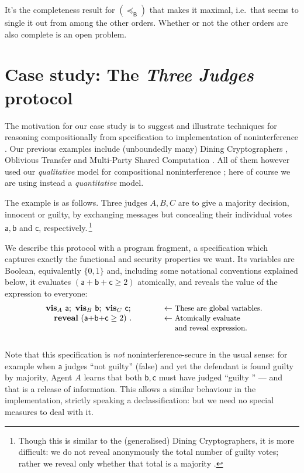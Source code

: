 \documentclass[runningheads]{llncs}
\makeatletter
\newcommand{\Bt}{\mathsf{B}}
\newcommand\Va {\mathsf{a}}
\newcommand\Vb {\mathsf{b}}
\newcommand\Vc {\mathsf{c}}
\newcommand\BRef {\mathrel{\preceq_\Bt}}
\newcommand\Reveal {\textbf{reveal}}
\newcommand\False {\textsf{false}}
\newcommand\Vis {\textbf{vis}}
\newenvironment{NumMini}[1]{\begin{equation}\label{#1}\begin{minipage}{.8\linewidth}}{\end{minipage}\end{equation}}
\newenvironment{Reason}{\vspace{-.0em}\begin{tabbing}\hspace{2em}\= \hspace{1cm} \= \kill}{\end{tabbing}\vspace{-1em}}
\newcommand\Step[2] {#1 \> $\begin{array}[t]{@{}llll}#2\end{array}$ \\}
\makeatother
\begin{document}
It's the completeness result for $(\BRef)$ that makes it maximal, i.e.\ that seems to single it out from among the other orders. 
Whether or not the other orders are also complete is an open problem. 


\section{Case study: The \emph{Three Judges} protocol}\label{s1727}

The motivation for our case study is to suggest and illustrate techniques for reasoning compositionally from specification to implementation of noninterference \cite{Morgan:07,McIver:09b,PSG}. Our previous examples include (unboundedly many) Dining Cryptographers \cite{Chaum:88}, Oblivious Transfer \cite{Rivest:99} and Multi-Party Shared Computation \cite{Yao:82}. All of them however used our \emph{qualitative} model for compositional noninterference \cite{Morgan:07,McIver:09b}; here of course we are using instead a \emph{quantitative} model.

The example is as follows. Three judges $A,B,C$ are to give a majority decision, innocent or guilty, by exchanging messages but concealing their individual votes $\Va,\Vb$ and $\Vc$, respectively.\,\footnote{Though this is similar to the (generalised) Dining Cryptographers, it is more difficult: we do not reveal anonymously the total number of guilty votes; rather we reveal only whether that total is a majority \cite[\texttt{Morgan:09a}]{PSG}.}

We describe this protocol with a program fragment, a specification which captures exactly the functional and security properties we want. Its variables are Boolean, equivalently $\{0,1\}$ and, including some notational conventions explained below, it evaluates $(\Va{+}\Vb{+}\Vc \geq 2)$ atomically, and reveals the value of the expression to everyone:
\begin{NumMini}{e1035}\begin{Reason}
\Step{}{
\hspace{-1em}
\Vis_{A}~\Va;~ \Vis_{B}~\Vb;~ \Vis_{C}~\Vc;
  & \hspace{3em}\textrm{$\leftarrow$\small\ These are global variables.} \\
 \Reveal~(\Va{+}\Vb{+}\Vc \geq 2) ~.
& \hspace{3em}\textrm{$\leftarrow$\small\ Atomically evaluate}\\
  & \hspace{3em}\textrm{\hspace{1em}\small\ and reveal expression.}
}
\end{Reason}\end{NumMini}Note that this specification is \emph{not} noninterference-secure in the usual sense: for example when $\Va$ judges ``not guilty'' (\False) and yet the defendant is found guilty by majority, Agent $A$ learns that both $\Vb,\Vc$ must have judged ``guilty '' --- and that is a release of information. This allows a similar behaviour in the implementation, strictly speaking a declassification: but we need no special measures to deal with it.
\end{document}
